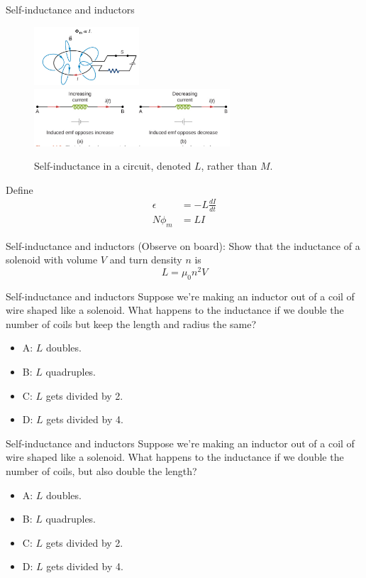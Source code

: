 \documentclass{beamer}
\begin{document}
\begin{frame}{Self-inductance and inductors}
\small
\begin{figure}
\centering
\includegraphics[width=0.35\textwidth]{figures/ind3.png} \\
\includegraphics[width=0.65\textwidth,trim=0cm 0.1cm 0cm 0cm,clip=true]{figures/ind4.png}
\caption{\label{fig:ind4} Self-inductance in a circuit, denoted $L$, rather than $M$.}
\end{figure}
Define
\begin{align}
\epsilon &= - L\frac{dI}{dt} \\
N \phi_m &= LI
\end{align}
\end{frame}

\begin{frame}{Self-inductance and inductors}
(Observe on board): Show that the inductance of a solenoid with volume $V$ and turn density $n$ is
\begin{equation}
L = \mu_0 n^2 V
\end{equation}
\end{frame}

\begin{frame}{Self-inductance and inductors}
Suppose we're making an inductor out of a coil of wire shaped like a solenoid.  What happens to the inductance if we double the number of coils but keep the length and radius the same?
\begin{itemize}
\item A: $L$ doubles.
\item B: $L$ quadruples.
\item C: $L$ gets divided by 2.
\item D: $L$ gets divided by 4.
\end{itemize}
\end{frame}

\begin{frame}{Self-inductance and inductors}
Suppose we're making an inductor out of a coil of wire shaped like a solenoid.  What happens to the inductance if we double the number of coils, but also double the length?
\begin{itemize}
\item A: $L$ doubles.
\item B: $L$ quadruples.
\item C: $L$ gets divided by 2.
\item D: $L$ gets divided by 4.
\end{itemize}
\end{frame}
\end{document}
